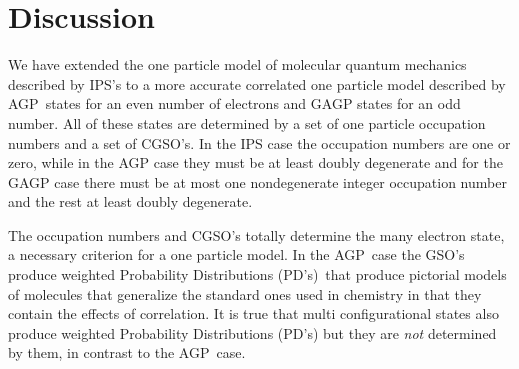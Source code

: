 \documentclass[titlepage]{article}%
\begin{document}
\section{Discussion\label{Discussion}}

We have extended the one particle model of molecular quantum mechanics
described by IPS's to a more accurate correlated one particle model described
by AGP\ states for an even number of electrons and GAGP states for an odd
number. All of these states are determined by a set of one particle occupation
numbers and a set of CGSO's. In the IPS case the occupation numbers are one or
zero, while in the AGP case they must be at least doubly degenerate and for
the GAGP case there must be at most one nondegenerate integer occupation
number and the rest at least doubly degenerate.

The occupation numbers and CGSO's totally determine the many electron state, a
necessary criterion for a one particle model. In the AGP\ case the GSO's
produce weighted Probability Distributions (PD's)\ that produce pictorial
models of molecules that generalize the standard ones used in chemistry in
that they contain the effects of correlation. It is true that multi
configurational states also produce weighted Probability Distributions (PD's)
but they are \emph{not} determined by them, in contrast to the AGP\ case.
\end{document}
